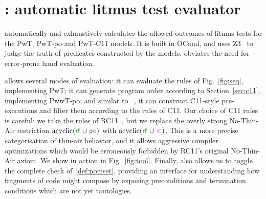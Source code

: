 \section{\PwTerTITLE: automatic litmus test evaluator}
\label{sec:tool}

\PwTer{} automatically and exhaustively calculates the allowed outcomes of litmus tests for the PwT, PwT-po and PwT-C11 models. It is built in OCaml, and uses Z3~\cite{Z3Solver} to judge the truth of predicates constructed by the models. \PwTer{} obviates the need for error-prone hand evaluation.

\PwTer{} allows several modes of evaluation: it can evaluate the rules of Fig.~\ref{fig:seq}, implementing PwT; it can generate program order according to Section~\ref{sec:c11}, implementing PwwT-po; and similar to \MRD~\cite{DBLP:conf/esop/PaviottiCPWOB20}, it can construct C11-style pre-executions and filter them according to the rules of C11.
Our choice of C11 rules is careful: we take the rules of RC11~\cite{DBLP:conf/pldi/LahavVKHD17}, but we replace the overly strong No-Thin-Air restriction $\text{acyclic}(\rrf\cup\rpox)$ with $\text{acyclic}(\rrf\cup\lt)$. 
This is a more precise categorisation of thin-air behavior, and it allows aggressive compiler optimizations which would be erroneously forbidden by RC11's original No-Thin-Air axiom.
We show \PwTer{} in action in Fig.~\ref{fig:tool}.
Finally, \PwTer{} also allows us to toggle the complete check of~\ref{def:pomset}, providing an interface for understanding how fragments of code might compose by exposing preconditions and termination conditions which are not yet tautologies.






